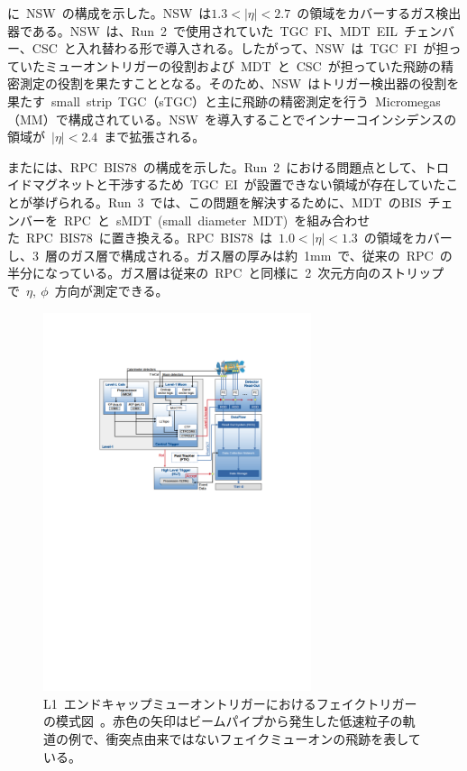に~NSW~の構成を示した。NSW~は$1.3<|\eta|<2.7$~の領域をカバーするガス検出器である。NSW~は、Run~2~で使用されていた~TGC~FI、MDT~EIL~チェンバー、CSC~と入れ替わる形で導入される。したがって、NSW~は~TGC~FI~が担っていたミューオントリガーの役割および~MDT~と~CSC~が担っていた飛跡の精密測定の役割を果たすこととなる。そのため、NSW~はトリガー検出器の役割を果たす~small~strip~TGC（sTGC）と主に飛跡の精密測定を行う~Micromegas（MM）で構成されている。NSW~を導入することでインナーコインシデンスの領域が~$|\eta|<2.4$~まで拡張される。

またには、RPC~BIS78~の構成を示した。Run~2~における問題点として、トロイドマグネットと干渉するため~TGC~EI~が設置できない領域が存在していたことが挙げられる。Run~3~では、この問題を解決するために、MDT~のBIS~チェンバーを~RPC~と~sMDT~(small~diameter~MDT)~を組み合わせた~RPC~BIS78~に置き換える。RPC~BIS78~は~$1.0<|\eta|<1.3$~の領域をカバーし、3~層のガス層で構成される。ガス層の厚みは約~1mm~で、従来の~RPC~の半分になっている。ガス層は従来の~RPC~と同様に~2~次元方向のストリップで~$\eta,~\phi$~方向が測定できる。

\begin{figure}[H]
        \centering   
        \includegraphics[width=0.7\textwidth,page=2]{img/pdf/trigger.pdf}
        \caption[L1~エンドキャップミューオントリガーにおけるフェイクトリガーの模式図]{L1~エンドキャップミューオントリガーにおけるフェイクトリガーの模式図~\cite{AR:02}。赤色の矢印はビームパイプから発生した低速粒子の軌道の例で、衝突点由来ではないフェイクミューオンの飛跡を表している。}
        \label{fig:fake}
\end{figure}

